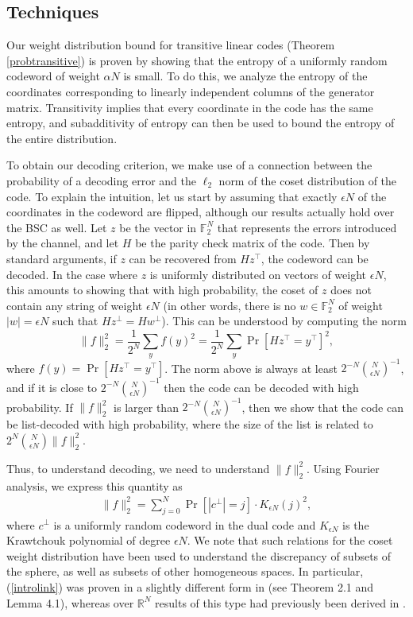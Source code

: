\documentclass[12pt]{article}
\newcommand{\R}{\mathbb{R}}
\newcommand{\F}{\mathbb{F}}
\begin{document}
\subsection{Techniques}
Our weight distribution bound for transitive linear codes (Theorem \ref{probtransitive}) is proven by showing that the entropy of a uniformly random codeword of weight $\alpha N$ is small. To do this, we analyze the entropy of the coordinates corresponding to linearly independent columns of the generator matrix. Transitivity implies that every coordinate in the code has the same entropy, and subadditivity of entropy can then be used to bound the entropy of the entire distribution.

To obtain our decoding criterion, we make use of a connection between the probability of a decoding error and the $\ell_2$ norm of the coset distribution of the code. To explain the intuition, let us start by assuming that exactly $\epsilon N$ of the coordinates in the codeword are flipped, although our results actually hold over the BSC as well. Let $z$ be the vector in  $\F_2^N$ that represents the errors introduced by the channel, and let $H$ be the parity check matrix of the code. Then by standard arguments, if $z$ can be recovered from $Hz^\intercal$, the codeword can be decoded. In the case where $z$ is uniformly distributed on vectors of weight $\epsilon N$, this amounts to showing that
with high probability, the coset of $z$ does not contain any string of weight $\epsilon N$ (in other words, there is no $w\in\F_2^N$ of weight $|w|=\epsilon N$ such that $Hz^\perp=Hw^\perp$). This can be understood by computing the norm $$\|f\|_2^2 = \frac{1}{2^N}\sum_{y} f(y)^2 = \frac{1}{2^N}\sum_{y} \Pr[Hz^\intercal = y^\intercal]^2,$$where $f(y) = \Pr[Hz^\intercal = y^\intercal]$. The norm above is always at least $2^{-N}\binom{N}{\epsilon N}^{-1}$, and if it is close to $2^{-N}\binom{N}{\epsilon N}^{-1}$ then the code can be decoded with high probability. If $\|f\|_2^2$ is larger than $2^{-N}\binom{N}{\epsilon N}^{-1}$, then we show that the code can be list-decoded with high probability, where the size of the list is related to $2^N\binom{N}{\epsilon N} \|f\|_2^2$.

Thus, to understand decoding, we need to understand $\|f\|_2^2$. Using Fourier analysis, we express this quantity as
\begin{align}\label{introlink}
 \|f\|_2^2 = \sum_{j=0}^N \Pr[|c^\perp| = j] \cdot K_{\epsilon N}(j)^2,
 \end{align}
where $c^\perp$ is a uniformly random codeword in the dual code and $K_{\epsilon N}$ is the Krawtchouk polynomial of degree $\epsilon N$. 
We note that such relations for the coset weight distribution have been used to understand the discrepancy of subsets of the sphere, as well as subsets of other homogeneous spaces. In particular, (\ref{introlink}) was proven in a slightly different form in \cite{2021bargfourierlink} (see Theorem 2.1 and Lemma 4.1), whereas over $\R^N$ results of this type had previously been derived in \cite{bilyk2018stolarskyprinciple,skriganov2019stolarskyhomogeneous}.
\end{document}
